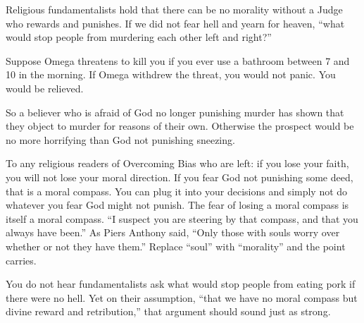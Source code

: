 
Religious fundamentalists hold that there can be no morality without a Judge who rewards and punishes. If we did not fear hell and yearn for heaven, ``what would stop people from murdering each other left and right?'' 

Suppose Omega threatens to kill you if you ever use a bathroom between 7 and 10 in the morning. If Omega withdrew the threat, you would not panic. You would be relieved.

So a believer who is afraid of God no longer punishing murder has shown that they object to murder for reasons of their own. Otherwise the prospect would be no more horrifying than God not punishing sneezing. 

To any religious readers of Overcoming Bias who are left: if you lose your faith, you will not lose your moral direction. If you fear God not punishing some deed, that is a moral compass. You can plug it into your decisions and simply not do whatever you fear God might not punish. The fear of losing a moral compass is itself a moral compass. ``I suspect you are steering by that compass, and that you always have been.'' As Piers Anthony said, ``Only those with souls worry over whether or not they have them.'' Replace ``soul'' with ``morality'' and the point carries.

You do not hear fundamentalists ask what would stop people from eating pork if there were no hell. Yet on their assumption, ``that we have no moral compass but divine reward and retribution,'' that argument should sound just as strong. 

